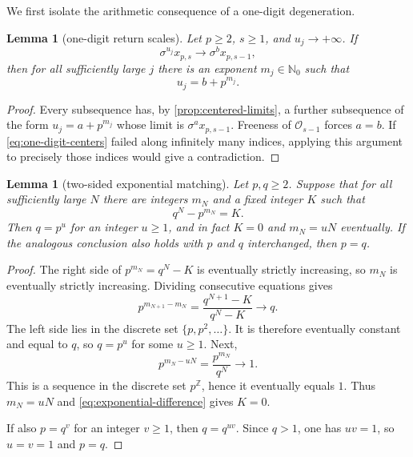 \documentclass[11pt,a4paper]{amsart}
\newtheorem{lemma}[theorem]{Lemma}
\theoremstyle{definition}
\theoremstyle{remark}
\newcommand{\N}{\mathbb N}
\newcommand{\Z}{\mathbb Z}
\newcommand{\cO}{\mathcal O}
\begin{document}
We first isolate the arithmetic consequence of a one-digit degeneration.

\begin{lemma}[one-digit return scales]\label{lem:one-digit-scales}
Let $p\geq2$, $s\geq1$, and $u_j\to+\infty$.  If
\[
 \sigma^{u_j}x_{p,s}\longrightarrow\sigma^b x_{p,s-1},
\]
then for all sufficiently large $j$ there is an exponent $m_j\in\N_0$ such
that
\begin{equation}\label{eq:one-digit-centers}
 u_j=b+p^{m_j}.
\end{equation}
\end{lemma}

\begin{proof}
Every subsequence has, by \cref{prop:centered-limits}, a further subsequence
of the form $u_j=a+p^{m_j}$ whose limit is $\sigma^a x_{p,s-1}$.  Freeness of
$\cO_{s-1}$ forces $a=b$.  If \eqref{eq:one-digit-centers} failed along
infinitely many indices, applying this argument to precisely those indices
would give a contradiction.
\end{proof}

\begin{lemma}[two-sided exponential matching]\label{lem:exponential-matching}
Let $p,q\geq2$.  Suppose that for all sufficiently large $N$ there are
integers $m_N$ and a fixed integer $K$ such that
\begin{equation}\label{eq:exponential-difference}
 q^N-p^{m_N}=K.
\end{equation}
Then $q=p^u$ for an integer $u\geq1$, and in fact $K=0$ and $m_N=uN$
eventually.  If the analogous conclusion also holds with $p$ and $q$
interchanged, then $p=q$.
\end{lemma}

\begin{proof}
The right side of $p^{m_N}=q^N-K$ is eventually strictly increasing, so
$m_N$ is eventually strictly increasing.  Dividing consecutive equations
gives
\[
 p^{m_{N+1}-m_N}
 =\frac{q^{N+1}-K}{q^N-K}\longrightarrow q.
\]
The left side lies in the discrete set $\{p,p^2,\ldots\}$.  It is therefore
eventually constant and equal to $q$, so $q=p^u$ for some $u\geq1$.  Next,
\[
 p^{m_N-uN}=\frac{p^{m_N}}{q^N}\longrightarrow1.
\]
This is a sequence in the discrete set $p^{\Z}$, hence it eventually equals
$1$.  Thus $m_N=uN$ and \eqref{eq:exponential-difference} gives $K=0$.

If also $p=q^v$ for an integer $v\geq1$, then
$q=q^{uv}$.  Since $q>1$, one has $uv=1$, so $u=v=1$ and $p=q$.
\end{proof}
\end{document}
